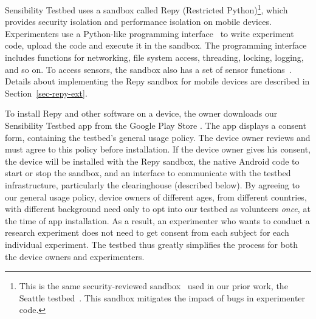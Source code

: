 Sensibility Testbed uses a sandbox called Repy (Restricted 
Python)\footnote{\scriptsize This is the 
same security-reviewed sandbox~\cite{cappos2010retaining} used in
our prior work, the Seattle testbed~\cite{seattle}. This sandbox
mitigates the impact of bugs in experimenter code.}, which 
provides security isolation and performance isolation on mobile devices.
Experimenters use a Python-like programming interface~\cite{repyv2}
to write experiment code, upload the code and execute it in the
sandbox. The programming interface includes functions for networking, 
file system access, threading, locking, logging, and so on. To access sensors, 
the sandbox also has a set of sensor functions~\cite{sensors}. 
Details about implementing the Repy sandbox for mobile 
devices are described in Section~\ref{sec-repy-ext}.

To install Repy and other software on a device, the owner downloads 
our Sensibility Testbed app from the Google Play Store \cite{sensibility-app}.
The app displays a consent form,  containing the testbed's 
general usage policy. The device owner reviews and must agree to this 
policy before installation. If the device owner gives his
consent, the device will be installed with the Repy sandbox, the native Android code to 
start or stop the sandbox, and an interface to communicate with the testbed 
infrastructure, particularly the clearinghouse (described below). 
By agreeing to our general usage policy, device 
owners of different ages, from different countries, with different
background need only to opt into our testbed as 
volunteers \textit{once}, at the time of app installation. As a result, an 
experimenter who wants to conduct a research experiment 
does not need to get consent from each subject for each individual
experiment. The testbed thus greatly simplifies the process for both the 
device owners and experimenters. 

